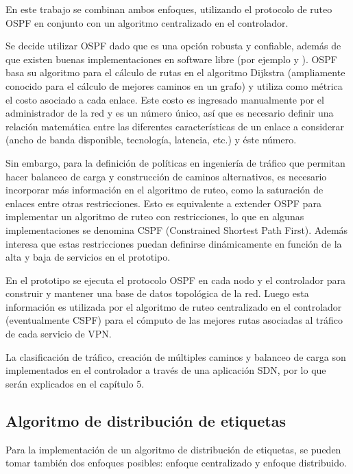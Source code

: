 En este trabajo se combinan ambos enfoques, utilizando el protocolo de ruteo OSPF en conjunto con un algoritmo centralizado en el controlador.

Se decide utilizar OSPF dado que es una opción robusta y confiable, adem\'as de que existen buenas implementaciones en software libre (por ejemplo \cite{Quagga} y \cite{BIRD}). OSPF basa su algoritmo para el c\'alculo de rutas en el algoritmo Dijkstra (ampliamente conocido para el c\'alculo de mejores caminos en un grafo) y utiliza como m\'etrica el costo asociado a cada enlace. Este costo es ingresado manualmente por el administrador de la red y es un n\'umero \'unico, as\'i que es necesario definir una relaci\'on matem\'atica entre las diferentes caracter\'isticas de un enlace a considerar (ancho de banda disponible, tecnolog\'ia, latencia, etc.) y \'este n\'umero. 

Sin embargo, para la definición de políticas en ingeniería de tr\'afico que permitan hacer balanceo de carga y construcción de caminos alternativos, es necesario incorporar m\'as informaci\'on en el algoritmo de ruteo, como la saturaci\'on de enlaces entre otras restricciones. Esto es equivalente a extender OSPF para implementar un algoritmo de ruteo con restricciones, lo que en algunas implementaciones se denomina CSPF (Constrained Shortest Path First). Adem\'as interesa que estas restricciones puedan definirse din\'amicamente en función de la alta y baja de servicios en el prototipo.

En el prototipo se ejecuta el protocolo OSPF en cada nodo y el controlador para construir y mantener una base de datos topol\'ogica de la red. Luego esta información es utilizada por el algoritmo de ruteo centralizado en el controlador (eventualmente CSPF) para el c\'omputo de las mejores rutas asociadas al tr\'afico de cada servicio de VPN.

La clasificaci\'on de tr\'afico, creación de m\'ultiples caminos y balanceo de carga son implementados en el controlador a través de una aplicaci\'on SDN, por lo que ser\'an explicados en el cap\'itulo 5.

\subsection{Algoritmo de distribución de etiquetas}

Para la implementaci\'on de un algoritmo de distribución de etiquetas, se pueden tomar también dos enfoques posibles: enfoque centralizado y enfoque distribuido.

